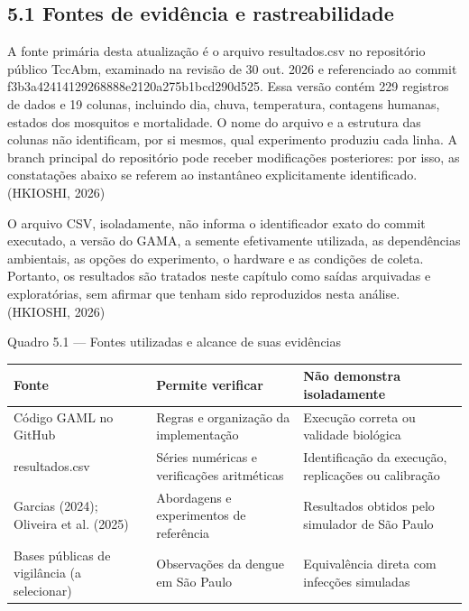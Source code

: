 \subsection{5.1 Fontes de evidência e
rastreabilidade}\label{fontes-de-eviduxeancia-e-rastreabilidade}

A fonte primária desta atualização é o arquivo resultados.csv no
repositório público TccAbm, examinado na revisão de 30 out. 2026 e
referenciado ao commit f3b3a42414129268888e2120a275b1bcd290d525. Essa
versão contém 229 registros de dados e 19 colunas, incluindo dia, chuva,
temperatura, contagens humanas, estados dos mosquitos e mortalidade. O
nome do arquivo e a estrutura das colunas não identificam, por si
mesmos, qual experimento produziu cada linha. A branch principal do
repositório pode receber modificações posteriores: por isso, as
constatações abaixo se referem ao instantâneo explicitamente
identificado. (HKIOSHI, 2026)

O arquivo CSV, isoladamente, não informa o identificador exato do commit
executado, a versão do GAMA, a semente efetivamente utilizada, as
dependências ambientais, as opções do experimento, o hardware e as
condições de coleta. Portanto, os resultados são tratados neste capítulo
como saídas arquivadas e exploratórias, sem afirmar que tenham sido
reproduzidos nesta análise. (HKIOSHI, 2026)

Quadro 5.1 --- Fontes utilizadas e alcance de suas evidências

\begin{longtable}[]{@{}
  >{\raggedright\arraybackslash}p{}
  >{\raggedright\arraybackslash}p{}
  >{\raggedright\arraybackslash}p{}@{}}
\toprule\noalign{}
\begin{minipage}[b]{\linewidth}\raggedright
\textbf{Fonte}
\end{minipage} & \begin{minipage}[b]{\linewidth}\raggedright
\textbf{Permite verificar}
\end{minipage} & \begin{minipage}[b]{\linewidth}\raggedright
\textbf{Não demonstra isoladamente}
\end{minipage} \\
\midrule\noalign{}
\endhead
\bottomrule\noalign{}
\endlastfoot
Código GAML no GitHub & Regras e organização da implementação & Execução
correta ou validade biológica \\
resultados.csv & Séries numéricas e verificações aritméticas &
Identificação da execução, replicações ou calibração \\
Garcias (2024); Oliveira et al. (2025) & Abordagens e experimentos de
referência & Resultados obtidos pelo simulador de São Paulo \\
Bases públicas de vigilância (a selecionar) & Observações da dengue em
São Paulo & Equivalência direta com infecções simuladas \\
\end{longtable}

